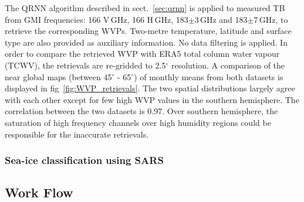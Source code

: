 \documentclass[12pt,oneside,a4paper]{article}
\begin{document}
The QRNN algorithm described in sect.~\ref{sec:qrnn} is applied to measured TB from GMI frequencies: 166 V\,GHz, 166 H\,GHz, 183$\pm$3\,GHz and 183$\pm$7\,GHz, to retrieve the corresponding WVPs. Two-metre temperature, latitude and surface type are also provided as auxiliary information. No data filtering is applied. In order to compare the retrieved WVP with ERA5 total column water  vapour (TCWV), the retrievals are re-gridded to 2.5$^{\circ}$ resolution. A comparison of the near global maps (between 45$^\circ$ - 65$^\circ$) of monthly means from both datasets is displayed in fig~\ref{fig:WVP_retrievals}. The two spatial distributions largely agree with each other except for few high WVP values in the southern hemisphere. The correlation between the two datasets is 0.97. Over southern hemisphere, the saturation of high frequency channels over high humidity regions could be responsible for the inaccurate retrievals. 

\subsubsection{Sea-ice classification using SARS}

\subsection{Work Flow}
\label{sec:wp}
\end{document}
